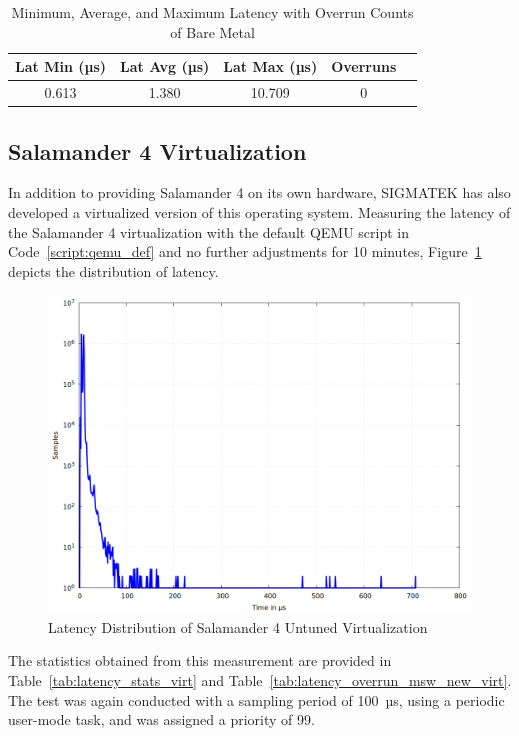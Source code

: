 \documentclass[MMR,Master,english]{style/twbook}
\begin{document}
\begin{table}[H]
	\centering
	\caption{Minimum, Average, and Maximum Latency with Overrun Counts of Bare Metal}
	\label{tab:latency_overrun_msw_hardware}
	\begin{tabular}{|c|c|c|c|c|}
		\hline
		\textbf{Lat Min (µs)} & \textbf{Lat Avg (µs)} & \textbf{Lat Max (µs)} & \textbf{Overruns} \\ \hline
		0.613                 & 1.380                 & 10.709                & 0                 \\ \hline
	\end{tabular}
\end{table}

\subsection{Salamander 4 Virtualization}\label{subsec:salamander4-virtualization}
In addition to providing Salamander 4 on its own hardware, SIGMATEK has also developed a virtualized version of this operating system. Measuring the latency of the Salamander 4 virtualization with the default QEMU script in Code~\ref{script:qemu_def} and no further adjustments for 10 minutes, Figure~\ref{fig:gnuplot_max_latency_default} depicts the distribution of latency.

\begin{figure}[H]
	\centering
	\includegraphics[width=0.7\columnwidth]{img/implementation/gnuplot_max_latency_default.png}
	\caption[Latency Distribution of Salamander 4 Untuned Virtualization]{Latency Distribution of Salamander 4 Untuned Virtualization}
	\label{fig:gnuplot_max_latency_default}
\end{figure}

\noindent The statistics obtained from this measurement are provided in Table~\ref{tab:latency_stats_virt} and Table~\ref{tab:latency_overrun_msw_new_virt}. The test was again conducted with a sampling period of 100~µs, using a periodic user-mode task, and was assigned a priority of 99.
\end{document}
